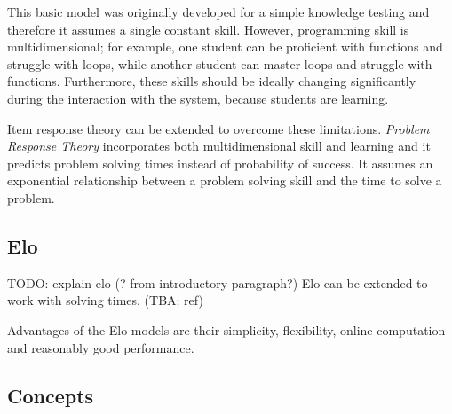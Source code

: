 This basic model was originally developed for a simple knowledge testing
  and therefore it assumes a single constant skill.
However, programming skill is multidimensional;
  for example, one student can be proficient with functions and struggle with loops,
  while another student can master loops and struggle with functions.
Furthermore, these skills should be ideally changing significantly during
  the interaction with the system, because students are learning.


Item response theory can be extended to overcome these limitations.
\emph{Problem Response Theory}
\cite{alg.problem-response-theory, pelanek-student-modeling-times}
incorporates both multidimensional skill and learning
and it predicts problem solving times instead of probability of success.
It assumes an exponential relationship between a problem solving skill
and the time to solve a problem.



\subsection{Elo}
\label{sec:elo}

TODO: explain elo (? from introductory paragraph?) \cite{alg.elo}
Elo can be extended to work with solving times. (TBA: ref)

Advantages of the Elo models are their simplicity, flexibility,
online-computation and reasonably good performance.


\subsection{Concepts}

